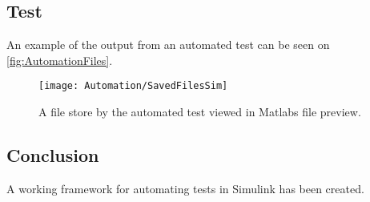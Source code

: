 \subsection{Test}
An example of the output from an automated test can be seen on \autoref{fig:AutomationFiles}.

\begin{figure} [H]
	\centering
	\texttt{[image: Automation/SavedFilesSim]}
	\caption{A file store by the automated test viewed in Matlabs file preview.}
	\label{fig:AutomationFiles}
\end{figure}


\subsection{Conclusion}
A working framework for automating tests in Simulink has been created. 

